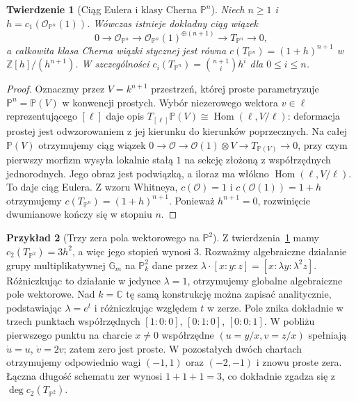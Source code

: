 \documentclass[11pt,a4paper,openany]{report}
\numberwithin{equation}{section}
\theoremstyle{plain}
\newtheorem{twierdzenie}{Twierdzenie}[section]
\theoremstyle{definition}
\newtheorem{przyklad}[twierdzenie]{Przykład}
\theoremstyle{remark}
\newcommand{\Z}{\mathbb Z}
\newcommand{\C}{\mathbb C}
\newcommand{\PP}{\mathbb P}
\begin{document}
\begin{twierdzenie}[Ciąg Eulera i klasy Cherna $\PP^n$]
\label{tw:ga7-euler}
Niech $n\ge1$ i $h=c_1(\mathcal O_{\PP^n}(1))$.
Wówczas istnieje dokładny ciąg wiązek
\[
0\longrightarrow\mathcal O_{\PP^n}
\longrightarrow\mathcal O_{\PP^n}(1)^{\oplus(n+1)}
\longrightarrow T_{\PP^n}\longrightarrow0,
\]
a całkowita klasa Cherna wiązki stycznej jest równa
$c(T_{\PP^n})=(1+h)^{n+1}$ w
$\Z[h]/(h^{n+1})$. W szczególności
$c_i(T_{\PP^n})=\binom{n+1}{i}h^i$ dla $0\le i\le n$.
\end{twierdzenie}
\begin{proof}
Oznaczmy przez $V=k^{n+1}$ przestrzeń, której proste
parametryzuje $\PP^n=\PP(V)$ w konwencji prostych.
Wybór niezerowego wektora $v\in\ell$ reprezentującego
$[\ell]$ daje opis
$T_{[\ell]}\PP(V)\cong\operatorname{Hom}(\ell,V/\ell)$:
deformacja prostej jest odwzorowaniem z jej kierunku
do kierunków poprzecznych. Na całej $\PP(V)$ otrzymujemy
ciąg wiązek
$0\to\mathcal O\to\mathcal O(1)\otimes V
\to T_{\PP(V)}\to0$, przy czym pierwszy morfizm
wysyła lokalnie stałą $1$ na sekcję złożoną z
współrzędnych jednorodnych. Jego obraz jest podwiązką,
a iloraz ma włókno $\operatorname{Hom}(\ell,V/\ell)$.
To daje ciąg Eulera. Z wzoru Whitneya,
$c(\mathcal O)=1$ i $c(\mathcal O(1))=1+h$
otrzymujemy $c(T_{\PP^n})=(1+h)^{n+1}$.
Ponieważ $h^{n+1}=0$, rozwinięcie dwumianowe
kończy się w stopniu $n$.
\end{proof}

\begin{przyklad}[Trzy zera pola wektorowego na $\PP^2$]
\label{prz:ga7-vector-field}
Z twierdzenia~\ref{tw:ga7-euler} mamy
$c_2(T_{\PP^2})=3h^2$, a więc jego stopień wynosi $3$.
Rozważmy algebraiczne działanie grupy multiplikatywnej
$\mathbb G_m$ na $\PP^2_k$ dane przez
$\lambda\cdot[x:y:z]=[x:\lambda y:\lambda^2 z]$.
Różniczkując to działanie w jedynce $\lambda=1$,
otrzymujemy globalne algebraiczne pole wektorowe.
Nad $k=\C$ tę samą konstrukcję można zapisać
analitycznie, podstawiając $\lambda=e^t$
i różniczkując względem $t$ w zerze.
Pole znika dokładnie w trzech punktach współrzędnych
$[1:0:0]$, $[0:1:0]$, $[0:0:1]$.
W pobliżu pierwszego punktu na charcie $x\ne0$
współrzędne $(u=y/x,v=z/x)$ spełniają
$\dot u=u$, $\dot v=2v$; zatem zero jest proste.
W pozostałych dwóch chartach otrzymujemy odpowiednio
wagi $(-1,1)$ oraz $(-2,-1)$ i znowu proste zera.
Łączna długość schematu zer wynosi $1+1+1=3$,
co dokładnie zgadza się z $\deg c_2(T_{\PP^2})$.
\end{przyklad}
\end{document}
